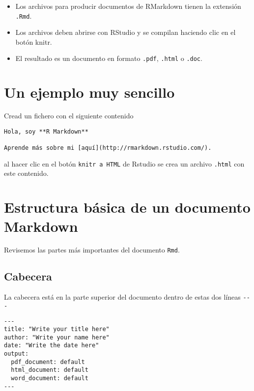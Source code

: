 \documentclass[
]{book}
\providecommand{\tightlist}{%
  \setlength{\itemsep}{0pt}\setlength{\parskip}{0pt}}
\begin{document}
\begin{itemize}
\tightlist
\item
  Los archivos para producir documentos de RMarkdown tienen la extensión \texttt{.Rmd}.
\item
  Los archivos deben abrirse con RStudio y se compilan haciendo clic en el botón knitr.
\item
  El resultado es un documento en formato \texttt{.pdf}, \texttt{.html} o \texttt{.doc}.
\end{itemize}

\hypertarget{un-ejemplo-muy-sencillo}{%
\section{Un ejemplo muy sencillo}\label{un-ejemplo-muy-sencillo}}

Cread un fichero con el siguiente contenido

\begin{verbatim}
Hola, soy **R Markdown**

Aprende más sobre mi [aquí](http://rmarkdown.rstudio.com/).
\end{verbatim}

al hacer clic en el botón \texttt{knitr\ a\ HTML} de Rstudio se crea un archivo \texttt{.html} con este contenido.

\hypertarget{estructura-buxe1sica-de-un-documento-markdown}{%
\section{Estructura básica de un documento Markdown}\label{estructura-buxe1sica-de-un-documento-markdown}}

Revisemos las partes más importantes del documento \texttt{Rmd}.

\hypertarget{cabecera}{%
\subsection{Cabecera}\label{cabecera}}

La cabecera está en la parte superior del documento dentro de estas dos líneas \texttt{-\/-\/-}

\begin{verbatim}
---
title: "Write your title here"
author: "Write your name here"
date: "Write the date here"
output:
  pdf_document: default
  html_document: default
  word_document: default
---
\end{verbatim}
\end{document}
